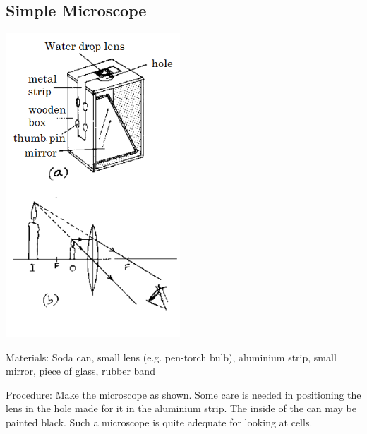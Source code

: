 \begin{multicols}{2}
\columnbreak

\subsection{Simple Microscope}  %

\begin{center}
\includegraphics[width=0.49\textwidth]{./img/source/simple-microscope.png}
\end{center}

\begin{description*}
\item[Materials:]{Soda can, small lens (e.g. pen-torch bulb), aluminium strip, small mirror, piece of glass, rubber band}
\item[Procedure:]{Make the microscope as shown.
Some care is needed in
positioning the lens in the hole
made for it in the aluminium
strip. The inside of the can may be
painted black. Such a microscope
is quite adequate for looking at
cells.}
\end{description*}


\end{multicols}
